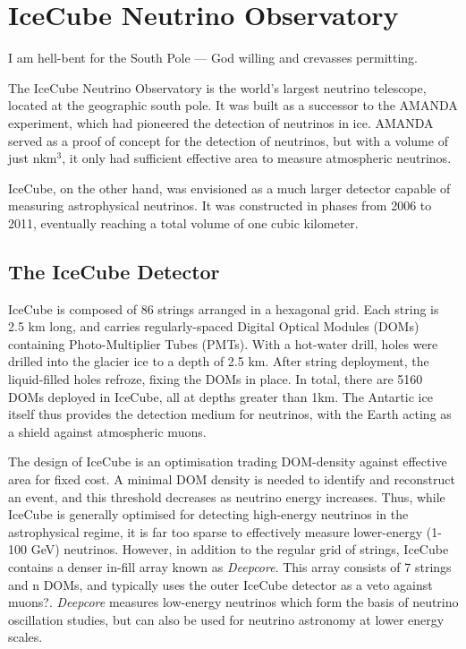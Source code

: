 \setchapterpreamble[u]{\margintoc}
\chapter{IceCube Neutrino Observatory}
\begin{fquote} I am hell-bent for the South Pole — God willing and crevasses permitting.
\end{fquote}
The IceCube Neutrino Observatory is the world's largest neutrino telescope, located at the geographic south pole. It was built as a successor to the AMANDA experiment, which had pioneered the detection of neutrinos in ice. AMANDA served as a proof of concept for the detection of neutrinos, but with a volume of just nkm$^{3}$, it only had sufficient effective area to measure atmospheric neutrinos. 

IceCube, on the other hand, was envisioned as a much larger detector capable of measuring astrophysical neutrinos. It was constructed in phases from 2006 to 2011, eventually reaching a total volume of one cubic kilometer. 

\section{The IceCube Detector}

IceCube is composed of 86 strings arranged in a hexagonal grid. Each string is 2.5 km long, and carries regularly-spaced Digital Optical Modules (DOMs) containing Photo-Multiplier Tubes (PMTs). With a hot-water drill, holes were drilled into the glacier ice to a depth of 2.5 km. After string deployment, the liquid-filled holes refroze, fixing the DOMs in place. In total, there are 5160 DOMs deployed in IceCube, all at depths greater than 1km. The Antartic ice itself thus provides the detection medium for neutrinos, with the Earth acting as a shield against atmospheric muons.

The design of IceCube is an optimisation trading DOM-density against effective area for fixed cost. A minimal DOM density is needed to identify and reconstruct an event, and this threshold decreases as neutrino energy increases. Thus, while IceCube is generally optimised for detecting high-energy neutrinos in the astrophysical regime, it is far too sparse to effectively measure lower-energy (1-100 GeV) neutrinos. However, in addition to the regular grid of strings, IceCube contains a denser in-fill array known as \textit{Deepcore}. This array consists of 7 strings and n DOMs, and typically uses the outer IceCube detector as a veto against muons?. \textit{Deepcore} measures low-energy neutrinos which form the basis of neutrino oscillation studies, but can also be used for neutrino astronomy at lower energy scales.

